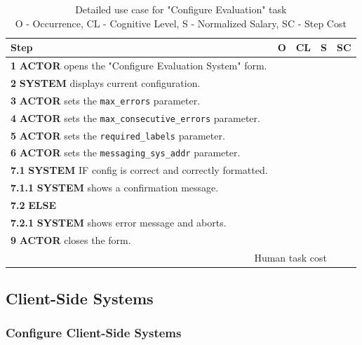\begin{table}[H]
    \centering
    \begin{tabularx}{\textwidth}{|X|c|c|c|c|}
    \hline
    \textbf{Step} & \textbf{O} & \textbf{CL} & \textbf{S} & \textbf{SC} \\
    \hline
    \textbf{1} \textbf{ACTOR} opens the "Configure Evaluation System" form. &  &  &  &  \\
    \hline
    \textbf{2} \textbf{SYSTEM} displays current configuration. & & & & \\
    \hline
    \textbf{3} \textbf{ACTOR} sets the \texttt{max\_errors} parameter. & & & & \\
    \hline
    \textbf{4} \textbf{ACTOR} sets the \texttt{max\_consecutive\_errors} parameter. & & & & \\
    \hline
    \textbf{5} \textbf{ACTOR} sets the \texttt{required\_labels} parameter. & & & & \\
    \hline
    \textbf{6} \textbf{ACTOR} sets the \texttt{messaging\_sys\_addr} parameter. & & & & \\
    \hline
    \textbf{7.1} \textbf{SYSTEM} IF config is correct and correctly formatted. & & & & \\
    \hline
    \textbf{7.1.1} \textbf{SYSTEM} shows a confirmation message. & & & & \\
    \hline
    \textbf{7.2} \textbf{ELSE} & & & & \\
    \hline
    \textbf{7.2.1} \textbf{SYSTEM} shows error message and aborts. & & & & \\
    \hline
    \textbf{9} \textbf{ACTOR} closes the form. &  &&  &  \\
    \hline
    \multicolumn{4}{|r|}{Human task cost} & \\
    \hline
    \end{tabularx}
    \caption{Detailed use case for "Configure Evaluation" task\\ 
    O - Occurrence, CL - Cognitive Level, S - Normalized Salary, SC - Step Cost}
    \label{table:configure_evaluation_system}
    \end{table}

\subsection{ Client-Side Systems}

\subsubsection{Configure Client-Side Systems}

